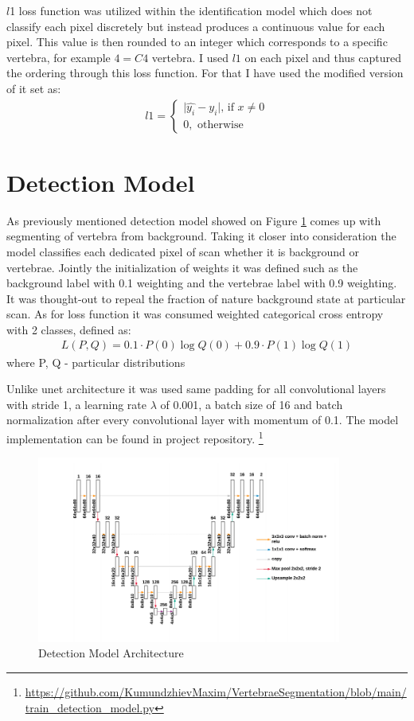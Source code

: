 $l$1 loss function was utilized within the identification model which does not classify each pixel discretely but instead produces a continuous value for each pixel. This value is then rounded to an integer which corresponds to a specific vertebra, for example $4 = C4$ vertebra. 
I used $l1$ on each pixel and thus captured the ordering through this loss function. For that I have used the modified version of it set as: 
\begin{align*}
 \text{$l1$} = \begin{cases} \lvert \hat{y_i} - y_i \rvert \mbox{, if } x\mbox{$\neq 0$} \\ 0, \mbox{ otherwise} \end{cases}
\end{align*}


\section{Detection Model}
As previously mentioned detection model showed on Figure \ref{fig:detection_model} comes up with segmenting of vertebra from background. Taking it closer into consideration the model classifies each dedicated pixel of scan whether it is background or vertebrae. Jointly the initialization of weights it was  defined such as the background label with 0.1 weighting and the vertebrae label with 0.9 weighting. It was thought-out to repeal the fraction of nature background state at particular scan. As for loss function it was consumed \cite{Zhang2018} weighted categorical cross entropy with 2 classes, defined as:
\begin{align*}
 L(P, Q) = 0.1 \cdot P(0)\log Q(0) + 0.9 \cdot P(1)\log Q(1)
\end{align*}
where P, Q - particular distributions 

Unlike unet architecture it was used same padding for all convolutional layers with stride 1, a learning rate
$\lambda$ of 0.001, a batch size of 16 and batch normalization after every convolutional layer with momentum of 0.1. The model implementation can be found in project repository.
\footnote{ \url{https://github.com/KumundzhievMaxim/VertebraeSegmentation/blob/main/train_detection_model.py}}

\begin{figure}[h]
    \centering \includegraphics[width=10cm]{images/detection_model.png}
    \caption {Detection Model Architecture}
    \label{fig:detection_model}
\end{figure}
 
